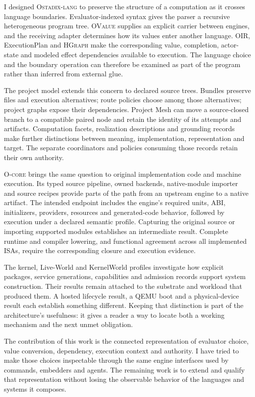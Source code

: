 \documentclass[11pt,oneside]{article}
\newcommand{\product}{{\mdseries\textsc{Ostadix-lang}}}
\newcommand{\ovalue}{{\mdseries\textsc{OValue}}}
\newcommand{\oir}{{\mdseries\textsc{OIR}}}
\newcommand{\hgraph}{{\mdseries\textsc{HGraph}}}
\newcommand{\ocore}{{\mdseries\textsc{O-core}}}
\begin{document}
I designed \product{} to preserve the structure of a computation as it crosses
language boundaries. Evaluator-indexed syntax gives the parser a recursive
heterogeneous program tree. \ovalue{} supplies an explicit carrier between
engines, and the receiving adapter determines how its values enter another
language. \oir{}, ExecutionPlan and \hgraph{} make the corresponding value,
completion, actor-state and modeled effect dependencies available to
execution. The language choice and the boundary operation can therefore be
examined as part of the program rather than inferred from external glue.

The project model extends this concern to declared source trees. Bundles
preserve files and execution alternatives; route policies choose among those
alternatives; project graphs expose their dependencies. Project Mesh can move
a source-closed branch to a compatible paired node and retain the identity of
its attempts and artifacts. Computation facets, realization descriptions and
grounding records make further distinctions between meaning, implementation,
representation and target. The separate coordinators and policies consuming
those records retain their own authority.

\ocore{} brings the same question to original implementation code and machine
execution. Its typed source pipeline, owned backends, native-module importer
and source recipes provide parts of the path from an upstream engine to a
native artifact. The intended endpoint includes the engine's required units,
ABI, initializers, providers, resources and generated-code behavior, followed
by execution under a declared semantic profile. Capturing the original source
or importing supported modules establishes an intermediate result. Complete
runtime and compiler lowering, and functional agreement across all
implemented ISAs, require the corresponding closure and execution evidence.

The kernel, Live-World and KernelWorld profiles investigate how explicit
packages, service generations, capabilities and admission records support
system construction. Their results remain attached to the substrate and
workload that produced them. A hosted lifecycle result, a QEMU boot and a
physical-device result each establish something different. Keeping that
distinction is part of the architecture's usefulness: it gives a reader a way
to locate both a working mechanism and the next unmet obligation.

The contribution of this work is the connected representation of evaluator
choice, value conversion, dependency, execution context and authority. I have
tried to make those choices inspectable through the same engine interfaces
used by commands, embedders and agents. The remaining work is to extend and
qualify that representation without losing the observable behavior of the
languages and systems it composes.
\end{document}
